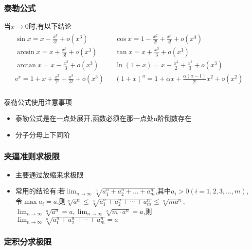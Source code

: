 \documentclass[12pt, a4paper, oneside, UTF8]{ctexbook}  %
\begin{document}
\begin{sloppypar}
    \subsubsection{泰勒公式}
    当$x\to 0$时,有以下结论
    \begin{align*}
        \boxed{\begin{aligned}
                        & \sin x =x-\frac{x^3}{3!}+o(x^3)                                &  & \cos x =1-\frac{x^2}{2!}+\frac{x^4}{4!}+o(x^4)                  \\
                        & \arcsin x =x+\frac{x^3}{3!}+o(x^3)                             &  & \tan x =x+\frac{x^3}3+o(x^3)                                    \\
                        & \arctan x =x-\frac{x^{3}}{3}+o(x^{3})                          &  & \ln(1+x) =x-\frac{x^{2}}{2}+\frac{x^{3}}{3}+o(x^{3})            \\
                        & \mathrm{e}^{x} =1+x+\frac{x^{2}}{2!}+\frac{x^{3}}{3!}+o(x^{3}) &  & (1+x)^{a} =1+\alpha x+\frac{\alpha(\alpha-1)}{2!}x^{2}+o(x^{2}) \\
                   \end{aligned}}
    \end{align*}
    \begin{criterion}{泰勒公式使用注意事项}{}
        \begin{itemize}
            \item 泰勒公式是在一点处展开,函数必须在那一点处n阶倒数存在
            \item 分子分母上下同阶
        \end{itemize}
    \end{criterion}
    \subsubsection{夹逼准则求极限}
    \begin{itemize}
        \item 主要通过放缩来求极限
        \item 常用的结论有:若$\lim _{n \to \infty} \sqrt[n]{a_1^n+a_2^n+...+a_m^n}$,其中$a_i >0(i=1,2,3,...,m)$,令$\max{a_i}=a$,则$\sqrt[n]{a^n}\leqslant\sqrt[n]{a_1^n+a_2^n+\cdots+a_m^n}\leqslant\sqrt[n]{ma^n}$,\\$\lim_{n\to\infty}\sqrt[n]{a^n}=a,\lim_{n\to\infty}\sqrt[n]{m\cdot a^n}=a$,则$\operatorname*{lim}_{n\to\infty}\sqrt[n]{a_1^n+a_2^n+\cdots+a_m^n}=a$
    \end{itemize}

    \subsubsection{定积分求极限}

    \ifx\allfiles\undefined
\end{sloppypar}
\end{document}
